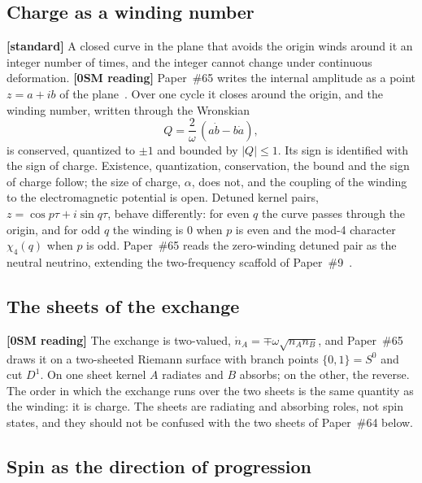 \documentclass[%
 reprint, amsmath,amssymb, aps, prb, ]{revtex4-2}
\numberwithin{equation}{section}
\begin{document}
\subsection{Charge as a winding number}

\textbf{[standard]} A closed curve in the plane that avoids the origin winds around it an integer number of times, and the integer cannot change under continuous deformation. \textbf{[0SM reading]} Paper~\#65 writes the internal amplitude as a point $z = a + ib$ of the plane~\cite{hanamura65}. Over one cycle it closes around the origin, and the winding number, written through the Wronskian
\begin{equation}
Q = \frac{2}{\omega}\,(a\dot b - b\dot a),
\label{eq:wronskian}
\end{equation}
is conserved, quantized to $\pm1$ and bounded by $|Q|\le1$. Its sign is identified with the sign of charge. Existence, quantization, conservation, the bound and the sign of charge follow; the size of charge, $\alpha$, does not, and the coupling of the winding to the electromagnetic potential is open. Detuned kernel pairs, $z = \cos p\tau + i\sin q\tau$, behave differently: for even $q$ the curve passes through the origin, and for odd $q$ the winding is $0$ when $p$ is even and the mod-4 character $\chi_4(q)$ when $p$ is odd. Paper~\#65 reads the zero-winding detuned pair as the neutral neutrino, extending the two-frequency scaffold of Paper~\#9~\cite{hanamura09}.

\subsection{The sheets of the exchange}

\textbf{[0SM reading]} The exchange is two-valued, $\dot n_A = \mp\omega\sqrt{n_An_B}$, and Paper~\#65 draws it on a two-sheeted Riemann surface with branch points $\{0,1\} = S^{0}$ and cut $D^{1}$. On one sheet kernel $A$ radiates and $B$ absorbs; on the other, the reverse. The order in which the exchange runs over the two sheets is the same quantity as the winding: it is charge. The sheets are radiating and absorbing roles, not spin states, and they should not be confused with the two sheets of Paper~\#64 below.

\subsection{Spin as the direction of progression}
\end{document}
